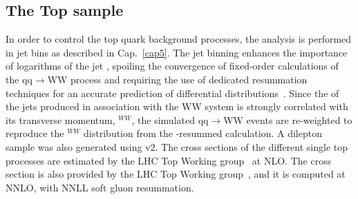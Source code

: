 \subsection*{The Top sample}
In order to control the top quark background processes, the analysis is
performed in jet bins as described in Cap.~\ref{cap5}. The jet binning enhances the importance of logarithms of the jet \pt, spoiling the convergence of 
fixed-order calculations of the qq$\rightarrow$WW process and requiring the use of dedicated resummation techniques for an
accurate prediction of differential distributions~\cite{Meade:2014fca,Jaiswal:2014yba}.  
Since the \pt of the jets produced in association with the WW system is strongly correlated with its transverse momentum, 
\pt$^{WW}$,  the simulated qq$\rightarrow$WW events are re-weighted  
to reproduce the \pt$^{WW}$ distribution from the \pt-resummed calculation.
A \ttbar  dilepton sample was also generated using \POWHEG v2. 
The cross sections of the different single top processes are estimated by the LHC Top Working group~\cite{singletop} at NLO.
The \ttbar cross section is also provided by the LHC Top Working group~\cite{topxsec}, and it is computed at NNLO, with NNLL soft gluon resummation. 


